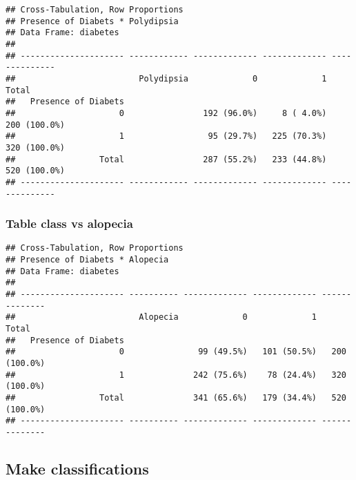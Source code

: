 \documentclass[
]{article}
\newenvironment{Shaded}{\begin{snugshade}}{\end{snugshade}}
\newcommand{\AttributeTok}[1]{\textcolor[rgb]{0.77,0.63,0.00}{#1}}
\newcommand{\FunctionTok}[1]{\textcolor[rgb]{0.00,0.00,0.00}{#1}}
\newcommand{\NormalTok}[1]{#1}
\newcommand{\SpecialCharTok}[1]{\textcolor[rgb]{0.00,0.00,0.00}{#1}}
\newcommand{\StringTok}[1]{\textcolor[rgb]{0.31,0.60,0.02}{#1}}
\begin{document}
\begin{verbatim}
## Cross-Tabulation, Row Proportions  
## Presence of Diabets * Polydipsia  
## Data Frame: diabetes  
## 
## --------------------- ------------ ------------- ------------- --------------
##                         Polydipsia             0             1          Total
##   Presence of Diabets                                                        
##                     0                192 (96.0%)     8 ( 4.0%)   200 (100.0%)
##                     1                 95 (29.7%)   225 (70.3%)   320 (100.0%)
##                 Total                287 (55.2%)   233 (44.8%)   520 (100.0%)
## --------------------- ------------ ------------- ------------- --------------
\end{verbatim}

\hypertarget{table-class-vs-alopecia}{%
\subsubsection{Table class vs alopecia}\label{table-class-vs-alopecia}}

\begin{Shaded}
\end{Shaded}

\begin{verbatim}
## Cross-Tabulation, Row Proportions  
## Presence of Diabets * Alopecia  
## Data Frame: diabetes  
## 
## --------------------- ---------- ------------- ------------- --------------
##                         Alopecia             0             1          Total
##   Presence of Diabets                                                      
##                     0               99 (49.5%)   101 (50.5%)   200 (100.0%)
##                     1              242 (75.6%)    78 (24.4%)   320 (100.0%)
##                 Total              341 (65.6%)   179 (34.4%)   520 (100.0%)
## --------------------- ---------- ------------- ------------- --------------
\end{verbatim}

\hypertarget{make-classifications}{%
\subsection{Make classifications}\label{make-classifications}}
\end{document}

